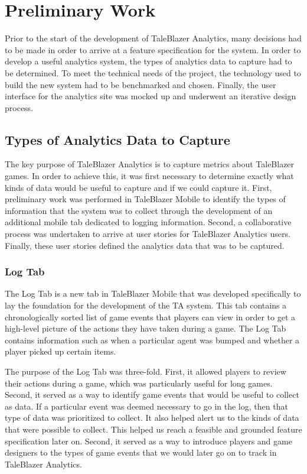 \chapter{Preliminary Work}

Prior to the start of the development of TaleBlazer Analytics, many decisions had to be made in order to arrive at a feature specification for the system. In order to develop a useful analytics system, the types of analytics data to capture had to be determined. To meet the technical needs of the project, the technology used to build the new system had to be benchmarked and chosen. Finally, the user interface for the analytics site was mocked up and underwent an iterative design process.

\section{Types of Analytics Data to Capture}

The key purpose of TaleBlazer Analytics is to capture metrics about TaleBlazer games. In order to achieve this, it was first necessary to determine exactly what kinds of data would be useful to capture and if we could capture it. First, preliminary work was performed in TaleBlazer Mobile to identify the types of information that the system was to collect through the development of an additional mobile tab dedicated to logging information. Second, a collaborative process was undertaken to arrive at user stories for TaleBlazer Analytics users. Finally, these user stories defined the analytics data that was to be captured. 

\subsection{Log Tab}

The Log Tab is a new tab in TaleBlazer Mobile that was developed specifically to lay the foundation for the development of the TA system. This tab contains a chronologically sorted list of game events that players can view in order to get a high-level picture of the actions they have taken during a game. The Log Tab contains information such as when a particular agent was bumped and whether a player picked up certain items. 

The purpose of the Log Tab was three-fold. First, it allowed players to review their actions during a game, which was particularly useful for long games. Second, it served as a way to identify game events that would be useful to collect as data. If a particular event was deemed necessary to go in the log, then that type of data was prioritized to collect. It also helped alert us to the kinds of data that were possible to collect. This helped us reach a feasible and grounded feature specification later on. Second, it served as a way to introduce players and game designers to the types of game events that we would later go on to track in TaleBlazer Analytics.


